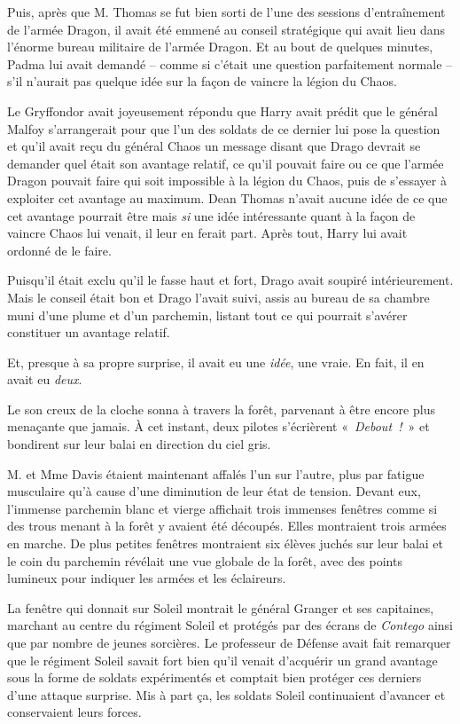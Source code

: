 Puis, après que M. Thomas se fut bien sorti de l'une des sessions d'entraînement de l'armée Dragon, il avait été emmené au conseil stratégique qui avait lieu dans l'énorme bureau militaire de l'armée Dragon.
Et au bout de quelques minutes, Padma lui avait demandé -- comme si c'était une question parfaitement normale -- s'il n'aurait pas quelque idée sur la façon de vaincre la légion du Chaos.

Le Gryffondor avait joyeusement répondu que Harry avait prédit que le général Malfoy s'arrangerait pour que l'un des soldats de ce dernier lui pose la question et qu'il avait reçu du général Chaos un message disant que Drago devrait se demander quel était son avantage relatif, ce qu'il pouvait faire ou ce que l'armée Dragon pouvait faire qui soit impossible à la légion du Chaos, puis de s'essayer à exploiter cet avantage au maximum.
Dean Thomas n'avait aucune idée de ce que cet avantage pourrait être mais \emph{si} une idée intéressante quant à la façon de vaincre Chaos lui venait, il leur en ferait part.
Après tout, Harry lui avait ordonné de le faire.

Puisqu'il était exclu qu'il le fasse haut et fort, Drago avait soupiré intérieurement.
Mais le conseil était bon et Drago l'avait suivi, assis au bureau de sa chambre muni d'une plume et d'un parchemin, listant tout ce qui pourrait s'avérer constituer un avantage relatif.

Et, presque à sa propre surprise, il avait eu une \emph{idée}, une vraie.
En fait, il en avait eu \emph{deux}.

Le son creux de la cloche sonna à travers la forêt, parvenant à être encore plus menaçante que jamais.
À cet instant, deux pilotes s'écrièrent «~\emph{Debout~!}~» et bondirent sur leur balai en direction du ciel gris.

\later

M. et Mme Davis étaient maintenant affalés l'un sur l'autre, plus par fatigue musculaire qu'à cause d'une diminution de leur état de tension.
Devant eux, l'immense parchemin blanc et vierge affichait trois immenses fenêtres comme si des trous menant à la forêt y avaient été découpés.
Elles montraient trois armées en marche.
De plus petites fenêtres montraient six élèves juchés sur leur balai et le coin du parchemin révélait une vue globale de la forêt, avec des points lumineux pour indiquer les armées et les éclaireurs.

La fenêtre qui donnait sur Soleil montrait le général Granger et ses capitaines, marchant au centre du régiment Soleil et protégés par des écrans de \emph{Contego} ainsi que par nombre de jeunes sorcières.
Le professeur de Défense avait fait remarquer que le régiment Soleil savait fort bien qu'il venait d'acquérir un grand avantage sous la forme de soldats expérimentés et comptait bien protéger ces derniers d'une attaque surprise.
Mis à part ça, les soldats Soleil continuaient d'avancer et conservaient leurs forces.

